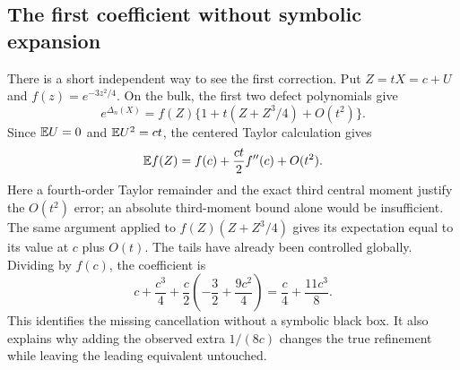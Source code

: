 \subsection{The first coefficient without symbolic expansion}
There is a short independent way to see the first correction.
Put $Z=tX=c+U$ and $f(z)=e^{-3z^2/4}$.
On the bulk, the first two defect polynomials give
\[
 e^{\Delta_n(X)}=f(Z)\{1+t(Z+Z^3/4)+O(t^2)\}.
\]
Since $\mathbb E U=0$ and $\mathbb E U^2=ct$, the centered Taylor calculation gives
\[
 \mathbb E f(Z)=f(c)+\frac{ct}{2}f''(c)+O(t^2).
\]
Here a fourth-order Taylor remainder and the exact third central moment
justify the $O(t^2)$ error; an absolute third-moment bound alone would be
insufficient. The same argument applied to $f(Z)(Z+Z^3/4)$ gives its
expectation equal to its value at $c$ plus $O(t)$.
The tails have already been controlled globally.
Dividing by $f(c)$, the coefficient is
\[
 c+\frac{c^3}{4}+\frac c2\left(-\frac32+\frac{9c^2}{4}\right)
       =\frac c4+\frac{11c^3}{8}.
\]
This identifies the missing cancellation without a symbolic black box.
It also explains why adding the observed extra $1/(8c)$ changes the true
refinement while leaving the leading equivalent untouched.
